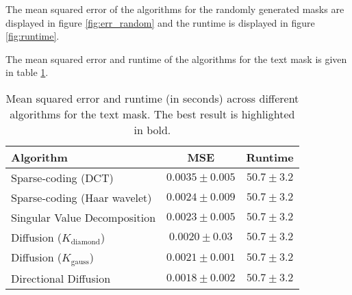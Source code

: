 The mean squared error of the algorithms for the randomly generated masks are displayed in figure \ref{fig:err_random} and the runtime is displayed in figure \ref{fig:runtime}.

The mean squared error and runtime of the algorithms for the text mask is given in table \ref{tbl:err_text}.



\begin{table}
	\centering
	\begin{tabular}{|l|c|c|}
		\hline
		\textbf{Algorithm} & \textbf{MSE} & \textbf{Runtime} \\ \hline \hline
		Sparse-coding (DCT) & $0.0035 \pm 0.005$ & $50.7 \pm 3.2$ \\ \hline
		Sparse-coding (Haar wavelet) & $0.0024 \pm 0.009$ & $50.7 \pm 3.2$ \\ \hline
		Singular Value Decomposition & $0.0023 \pm 0.005$ & $50.7 \pm 3.2$ \\ \hline
		Diffusion ($K_{\text{diamond}}$) & $0.0020 \pm 0.03$ & $50.7 \pm 3.2$ \\ \hline
		Diffusion ($K_{\text{gauss}}$) & $0.0021 \pm 0.001$ & $50.7 \pm 3.2$ \\ \hline
		Directional Diffusion & $\mathbf{0.0018} \pm 0.002$ & $50.7 \pm 3.2$ \\ \hline
	\end{tabular}
	\caption{Mean squared error and runtime (in seconds) across different algorithms for the text mask. The best result is highlighted in bold.}
	\label{tbl:err_text}
\end{table}

